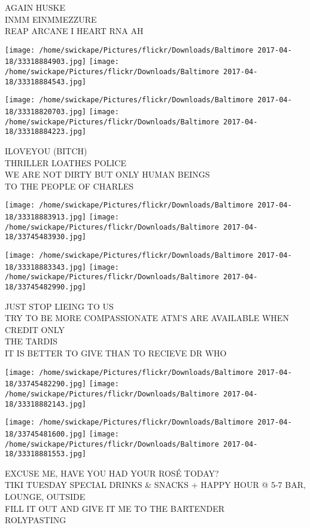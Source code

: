 \documentclass[10pt,letterpaper]{article}
\begin{document}
AGAIN HUSKE\\
INMM EINMMEZZURE\\
REAP ARCANE I HEART RNA AH\\
\pagebreak

\texttt{[image: /home/swickape/Pictures/flickr/Downloads/Baltimore 2017-04-18/33318884903.jpg]}
\texttt{[image: /home/swickape/Pictures/flickr/Downloads/Baltimore 2017-04-18/33318884543.jpg]}

\texttt{[image: /home/swickape/Pictures/flickr/Downloads/Baltimore 2017-04-18/33318820703.jpg]}
\texttt{[image: /home/swickape/Pictures/flickr/Downloads/Baltimore 2017-04-18/33318884223.jpg]}

ILOVEYOU (BITCH)\\
THRILLER LOATHES POLICE\\
WE ARE NOT DIRTY BUT ONLY HUMAN BEINGS\\
TO THE PEOPLE OF CHARLES\\
\pagebreak

\texttt{[image: /home/swickape/Pictures/flickr/Downloads/Baltimore 2017-04-18/33318883913.jpg]}
\texttt{[image: /home/swickape/Pictures/flickr/Downloads/Baltimore 2017-04-18/33745483930.jpg]}

\texttt{[image: /home/swickape/Pictures/flickr/Downloads/Baltimore 2017-04-18/33318883343.jpg]}
\texttt{[image: /home/swickape/Pictures/flickr/Downloads/Baltimore 2017-04-18/33745482990.jpg]}

JUST STOP LIEING TO US\\
TRY TO BE MORE COMPASSIONATE ATM'S ARE AVAILABLE WHEN CREDIT ONLY\\
THE TARDIS\\
IT IS BETTER TO GIVE THAN TO RECIEVE DR WHO\\
\pagebreak

\texttt{[image: /home/swickape/Pictures/flickr/Downloads/Baltimore 2017-04-18/33745482290.jpg]}
\texttt{[image: /home/swickape/Pictures/flickr/Downloads/Baltimore 2017-04-18/33318882143.jpg]}

\texttt{[image: /home/swickape/Pictures/flickr/Downloads/Baltimore 2017-04-18/33745481600.jpg]}
\texttt{[image: /home/swickape/Pictures/flickr/Downloads/Baltimore 2017-04-18/33318881553.jpg]}

EXCUSE ME, HAVE YOU HAD YOUR ROSÉ TODAY?\\
TIKI TUESDAY SPECIAL DRINKS \& SNACKS + HAPPY HOUR @ 5{-}7 BAR, LOUNGE, OUTSIDE\\
FILL IT OUT AND GIVE IT ME TO THE BARTENDER\\
ROLYPASTING\\
\pagebreak
\end{document}
